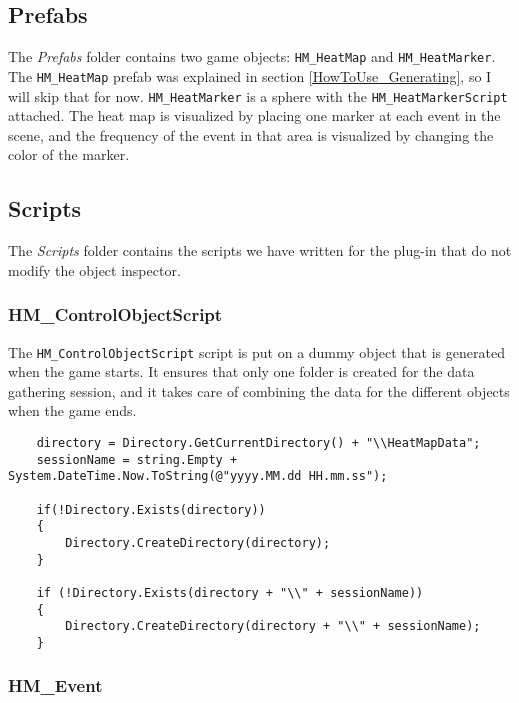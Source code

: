 \subsection{Prefabs}
\label{Overview_Folder_Prefabs}

The \textit{Prefabs} folder contains two game objects: \texttt{HM\_HeatMap} and \texttt{HM\_HeatMarker}. The \texttt{HM\_HeatMap} prefab was explained in section \ref{HowToUse_Generating}, so I will skip that for now. \texttt{HM\_HeatMarker} is a sphere with the \texttt{HM\_HeatMarkerScript} attached. The heat map is visualized by placing one marker at each event in the scene, and the frequency of the event in that area is visualized by changing the color of the marker.

\subsection{Scripts}
\label{Overview_Folder_Scripts}

The \textit{Scripts} folder contains the scripts we have written for the plug-in that do not modify the object inspector.

\subsubsection*{HM\_ControlObjectScript}

The \texttt{HM\_ControlObjectScript} script is put on a dummy object that is generated when the game starts. It ensures that only one folder is created for the data gathering session, and it takes care of combining the data for the different objects when the game ends.

\begin{lstlisting}
	directory = Directory.GetCurrentDirectory() + "\\HeatMapData";
	sessionName = string.Empty + System.DateTime.Now.ToString(@"yyyy.MM.dd HH.mm.ss");
				
	if(!Directory.Exists(directory))
	{
		Directory.CreateDirectory(directory);
	}
	
	if (!Directory.Exists(directory + "\\" + sessionName))
	{
		Directory.CreateDirectory(directory + "\\" + sessionName);
	}
\end{lstlisting}

\subsubsection*{HM\_Event}

